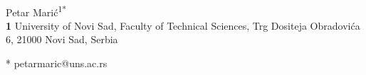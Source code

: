 \\
Petar Marić\textsuperscript{1*}
\\
\bigskip
\textbf{1} University of Novi Sad, Faculty of Technical Sciences, Trg Dositeja Obradovića 6, 21000 Novi Sad, Serbia
\\
\bigskip

* petarmaric@uns.ac.rs
